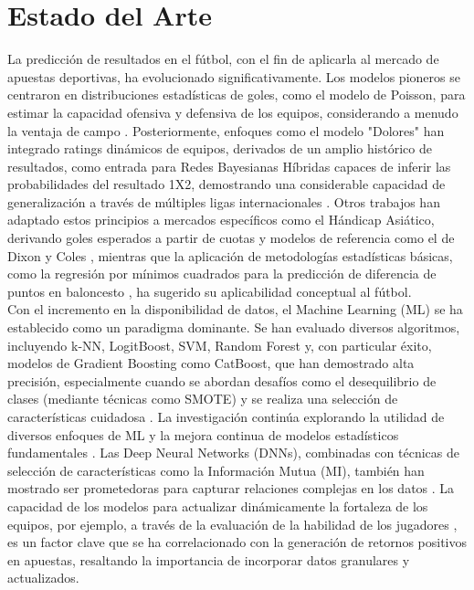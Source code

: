 \section{Estado del Arte}

La predicción de resultados en el fútbol, con el fin de aplicarla al mercado de apuestas deportivas, ha evolucionado significativamente.
Los modelos pioneros se centraron en distribuciones estadísticas de goles, como el modelo de Poisson, para estimar la capacidad ofensiva y defensiva de los equipos, considerando a menudo la ventaja de campo \cite{Fontanella2020Visual}.
Posteriormente, enfoques como el modelo "Dolores" han integrado ratings dinámicos de equipos, derivados de un amplio histórico de resultados, como entrada para Redes Bayesianas Híbridas capaces de inferir las probabilidades del resultado 1X2, demostrando una considerable capacidad de generalización a través de múltiples ligas internacionales \cite{Constantinou2019Dolores}.
Otros trabajos han adaptado estos principios a mercados específicos como el Hándicap Asiático, derivando goles esperados a partir de cuotas y modelos de referencia como el de Dixon y Coles \cite{Chen2019Cluster},
mientras que la aplicación de metodologías estadísticas básicas, como la regresión por mínimos cuadrados para la predicción de diferencia de puntos en baloncesto \cite{Lu2019NBAPointDiff}, ha sugerido su aplicabilidad conceptual al fútbol. \\

Con el incremento en la disponibilidad de datos, el Machine Learning (ML) se ha establecido como un paradigma dominante.
Se han evaluado diversos algoritmos, incluyendo k-NN, LogitBoost, SVM, Random Forest y, con particular éxito, modelos de Gradient Boosting como CatBoost, que han demostrado alta precisión, especialmente cuando se abordan desafíos como el desequilibrio de clases (mediante técnicas como SMOTE) y se realiza una selección de características cuidadosa \cite{Malamatinos2022GreekLeague}.
La investigación continúa explorando la utilidad de diversos enfoques de ML \cite{Jaeyalakshmi2023PredictingOutcomeML} y la mejora continua de modelos estadísticos fundamentales \cite{Loukas2024PoissonRegression}.
Las Deep Neural Networks (DNNs), combinadas con técnicas de selección de características como la Información Mutua (MI), también han mostrado ser prometedoras para capturar relaciones complejas en los datos \cite{Tammouch2024BettingML}.
La capacidad de los modelos para actualizar dinámicamente la fortaleza de los equipos, por ejemplo, a través de la evaluación de la habilidad de los jugadores \cite{Holmes2023PlayerRating}, es un factor clave que se ha correlacionado con la generación de retornos positivos en apuestas, resaltando la importancia de incorporar datos granulares y actualizados. \\

